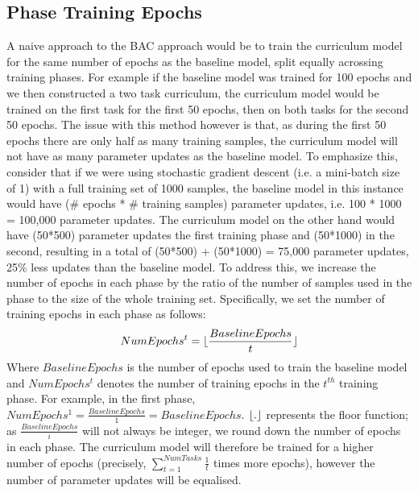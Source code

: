\subsection{Phase Training Epochs}
A naive approach to the BAC approach would be to train the curriculum model for the same number of epochs as the baseline model, split equally acrossing training phases. For example if the baseline model was trained for 100 epochs and we then constructed a two task curriculum, the curriculum model would be trained on the first task for the first 50 epochs, then on both tasks for the second 50 epochs. The issue with this method however is that, as during the first 50 epochs there are only half as many training samples, the curriculum model will not have as many parameter updates as the baseline model. To emphasize this, consider that if we were using stochastic gradient descent (i.e. a mini-batch size of 1) with a full training set of 1000 samples, the baseline model in this instance would have (\# epochs * \# training samples) parameter updates, i.e. 100 * 1000 = 100,000 parameter updates. The curriculum model on the other hand would have (50*500) parameter updates the first training phase and (50*1000) in the second, resulting in a total of   (50*500) + (50*1000) = 75,000 parameter updates, 25\% less updates than the baseline model. To address this, we increase the number of epochs in each phase by the ratio of the number of samples used in the phase to the size of the whole training set. Specifically, we set the number of training epochs in each phase as follows:
\begin{equation}\label{eq:BAC_Epochs}
NumEpochs^{t} =\lfloor \frac{BaselineEpochs}{t}\rfloor
\end{equation}
Where $BaselineEpochs$ is the number of epochs used to train the baseline model and $NumEpochs^{t}$ denotes the number of training epochs in the $t^{th}$ training phase. For example, in the first phase, $NumEpochs^{1} = \frac{BaselineEpochs}{1} = BaselineEpochs$. $\lfloor.\rfloor$ represents the floor function; as $\frac{BaselineEpochs}{i}$ will not always be integer, we round down the number of epochs in each phase. The curriculum model will therefore be trained for a higher number of epochs (precisely, $\sum_{t=1}^{NumTasks}{\frac{1}{t}}$ times more epochs), however the number of parameter updates will be equalised. 

